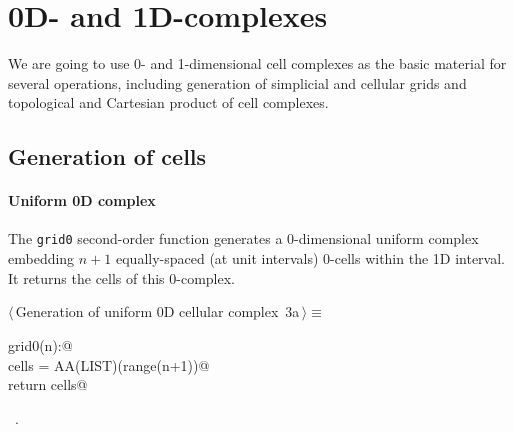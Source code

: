 \documentclass[11pt,oneside]{article}	%
\begin{document}
\section{0D- and 1D-complexes}
\label{sec:0-1-complexes}

We are going to use 0- and 1-dimensional cell complexes as the basic material for several operations, including generation of simplicial and cellular grids and topological and Cartesian product of cell complexes. 


\subsection{Generation of cells}

\paragraph{Uniform 0D complex}
The \texttt{grid0} second-order function generates a 0-dimensional uniform complex embedding $n+1$ equally-spaced (at unit intervals) 0-cells within the 1D interval. It returns the cells of this 0-complex.

\begin{flushleft} \small
\begin{minipage}{\linewidth} \label{scrap1}
\protect{}$\langle\,$Generation of uniform 0D cellular complex\nobreak\ {\footnotesize 3a}$\,\rangle\equiv$
\vspace{-1ex}
\begin{list}{}{} \item
\mbox{}\verb@def grid0(n):@\\
\mbox{}\verb@    cells = AA(LIST)(range(n+1))@\\
\mbox{}\verb@    return cells@\\
\mbox{}\verb@@{\NWsep}
\end{list}
\vspace{-1ex}
\footnotesize\addtolength{\baselineskip}{-1ex}
\begin{list}{}{\setlength{\itemsep}{-\parsep}\setlength{\itemindent}{-\leftmargin}}
\item \NWtxtMacroRefIn\ .
\end{list}
\end{minipage}\\[4ex]
\end{flushleft}
\end{document}
